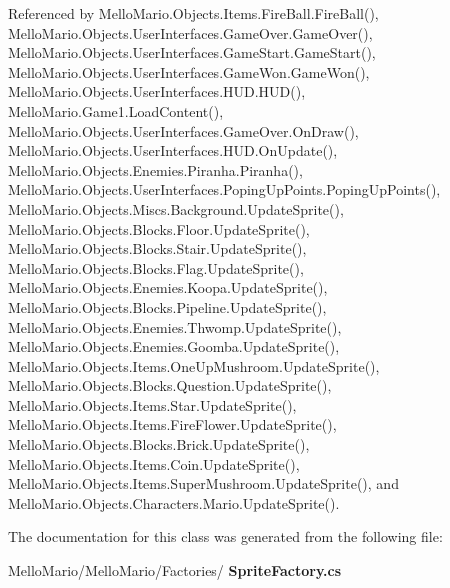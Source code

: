 Referenced by Mello\+Mario.\+Objects.\+Items.\+Fire\+Ball.\+Fire\+Ball(), Mello\+Mario.\+Objects.\+User\+Interfaces.\+Game\+Over.\+Game\+Over(), Mello\+Mario.\+Objects.\+User\+Interfaces.\+Game\+Start.\+Game\+Start(), Mello\+Mario.\+Objects.\+User\+Interfaces.\+Game\+Won.\+Game\+Won(), Mello\+Mario.\+Objects.\+User\+Interfaces.\+H\+U\+D.\+H\+U\+D(), Mello\+Mario.\+Game1.\+Load\+Content(), Mello\+Mario.\+Objects.\+User\+Interfaces.\+Game\+Over.\+On\+Draw(), Mello\+Mario.\+Objects.\+User\+Interfaces.\+H\+U\+D.\+On\+Update(), Mello\+Mario.\+Objects.\+Enemies.\+Piranha.\+Piranha(), Mello\+Mario.\+Objects.\+User\+Interfaces.\+Poping\+Up\+Points.\+Poping\+Up\+Points(), Mello\+Mario.\+Objects.\+Miscs.\+Background.\+Update\+Sprite(), Mello\+Mario.\+Objects.\+Blocks.\+Floor.\+Update\+Sprite(), Mello\+Mario.\+Objects.\+Blocks.\+Stair.\+Update\+Sprite(), Mello\+Mario.\+Objects.\+Blocks.\+Flag.\+Update\+Sprite(), Mello\+Mario.\+Objects.\+Enemies.\+Koopa.\+Update\+Sprite(), Mello\+Mario.\+Objects.\+Blocks.\+Pipeline.\+Update\+Sprite(), Mello\+Mario.\+Objects.\+Enemies.\+Thwomp.\+Update\+Sprite(), Mello\+Mario.\+Objects.\+Enemies.\+Goomba.\+Update\+Sprite(), Mello\+Mario.\+Objects.\+Items.\+One\+Up\+Mushroom.\+Update\+Sprite(), Mello\+Mario.\+Objects.\+Blocks.\+Question.\+Update\+Sprite(), Mello\+Mario.\+Objects.\+Items.\+Star.\+Update\+Sprite(), Mello\+Mario.\+Objects.\+Items.\+Fire\+Flower.\+Update\+Sprite(), Mello\+Mario.\+Objects.\+Blocks.\+Brick.\+Update\+Sprite(), Mello\+Mario.\+Objects.\+Items.\+Coin.\+Update\+Sprite(), Mello\+Mario.\+Objects.\+Items.\+Super\+Mushroom.\+Update\+Sprite(), and Mello\+Mario.\+Objects.\+Characters.\+Mario.\+Update\+Sprite().



The documentation for this class was generated from the following file\+:\begin{DoxyCompactItemize}
\item 
Mello\+Mario/\+Mello\+Mario/\+Factories/\textbf{ Sprite\+Factory.\+cs}\end{DoxyCompactItemize}

